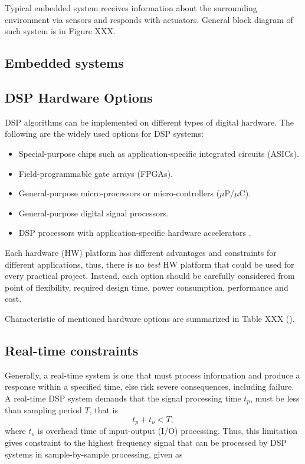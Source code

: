 \documentclass[twoside]{ctuthesis}
\theoremstyle{plain}
\theoremstyle{definition}
\theoremstyle{note}
\begin{document}
Typical embedded system receives information about the surrounding environment via sensors and responds with actuators. General block diagram of such system is in Figure XXX.																	
\subsection{Embedded systems}

\subsection{DSP Hardware Options}
DSP algorithms can be implemented on different types of digital hardware. The following are the widely used options for DSP systems:
\begin{itemize}
	\setlength{\itemsep}{5pt}
\item Special-purpose chips such as application-specific integrated circuits (ASICs).
\item Field-programmable gate arrays (FPGAs).
\item General-purpose micro-processors or micro-controllers ($\mu$P/$\mu$C).
\item General-purpose digital signal processors.
\item DSP processors with application-specific hardware accelerators \cite{cite:RT_DSP}.
\end{itemize}

Each hardware (HW) platform has different advantages and constraints for different applications, thus, there is no \textit{best} HW platform that could be used for every practical project. Instead, each option should be carefully considered from point of flexibility, required design time, power consumption, performance and cost. 

Characteristic of mentioned hardware options are summarized in Table XXX (\cite{cite:RT_DSP}).

\subsection{Real-time constraints}
\label{R-T constrains}
Generally, a real-time system is one that must process information and produce a response within a specified time, else risk severe consequences, including failure. A real-time DSP system demands that the signal processing time $t_{p}$, must be less than sampling period $T$, that is
\begin{equation} \label{eq:hardRealTime1}
t_{p}+t_{o}<T,
\end{equation}
where $t_{o}$ is overhead time of input-output (I/O) processing.
Thus, this limitation gives constraint to the highest frequency signal that can be processed by DSP systems in sample-by-sample processing, given as
\end{document}
